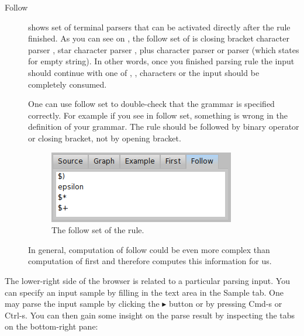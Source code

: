 \documentclass[a4paper,10pt,twoside]{book}
\begin{document}
\begin{description}
\item[Follow] shows set of terminal parsers that can be activated directly 
    after the rule finished.
  As you can see on , the follow set of  is 
    closing bracket character parser , star character parser , 
    plus character parser  or  parser (which states for empty string).
  In other words, once you finished parsing  rule the input should
    continue with one of , ,  characters or the input should be completely consumed.
  
  One can use follow set to double-check that the grammar is specified correctly.
  For example if you see  in  follow set, something is wrong
    in the definition of your grammar. 
  The  rule should be followed by binary operator or closing bracket, not 
    by opening bracket.
  
  \begin{figure}[ht]
    \begin{center}
      \includegraphics[width=.4\linewidth]{PPBrowserFollow}
      \caption{The follow set of the 
        rule. \label{fig:pp/browserFollow}}
    \end{center}
  \end{figure}
  
  In general, computation of follow could be even more complex than computation
    of first and therefore  computes this information for us.  

\end{description}

\noindent The lower-right side of the browser is related to a particular parsing input.
You can specify an input sample by filling in the text area in the Sample tab.
One may  parse the input sample by clicking the  \textsf{\small{$\blacktriangleright$}} button or by pressing Cmd-s or Ctrl-s.
You can then gain some insight on the parse result by inspecting the
tabs on the bottom-right pane:
\end{document}
